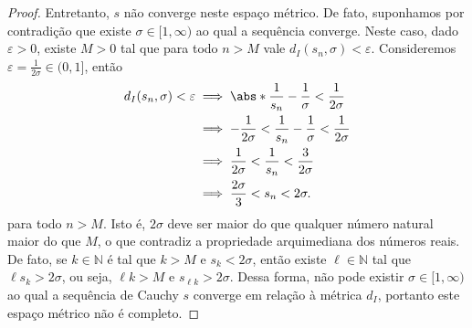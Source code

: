 \begin{proof}
    Entretanto, \(s\) não converge neste espaço métrico. De fato, suponhamos por contradição que existe \(\sigma \in [1,\infty)\) ao qual a sequência converge. Neste caso, dado \(\varepsilon > 0\), existe \(M > 0\) tal que para todo \(n > M\) vale \(d_I(s_n, \sigma) < \varepsilon\).
    Consideremos \(\varepsilon = \frac{1}{2\sigma} \in (0,1]\), então
    \begin{align*}
        d_I(s_n, \sigma) < \varepsilon &\implies \abs*{\frac1{s_n} - \frac1\sigma} < \frac{1}{2\sigma}\\
                                       &\implies -\frac{1}{2\sigma} < \frac1{s_n} - \frac{1}\sigma < \frac1{2\sigma}\\
                                       &\implies \frac{1}{2\sigma} < \frac1{s_n} < \frac{3}{2\sigma}\\
                                       &\implies \frac{2\sigma}{3} < s_n < 2\sigma.
    \end{align*}
    para todo \(n > M\). Isto é, \(2\sigma\) deve ser maior do que qualquer número natural maior do que \(M\), o que contradiz a propriedade arquimediana dos números reais. De fato, se \(k \in \mathbb{N}\) é tal que \(k > M\) e \(s_{k} < 2\sigma\), então existe \(\ell \in \mathbb{N}\) tal que \(\ell s_{k} > 2\sigma\), ou seja, \(\ell k > M\) e \(s_{\ell k} > 2\sigma\). Dessa forma, não pode existir \(\sigma \in [1,\infty)\) ao qual a sequência de Cauchy \(s\) converge em relação à métrica \(d_I\), portanto este espaço métrico não é completo.
\end{proof}
